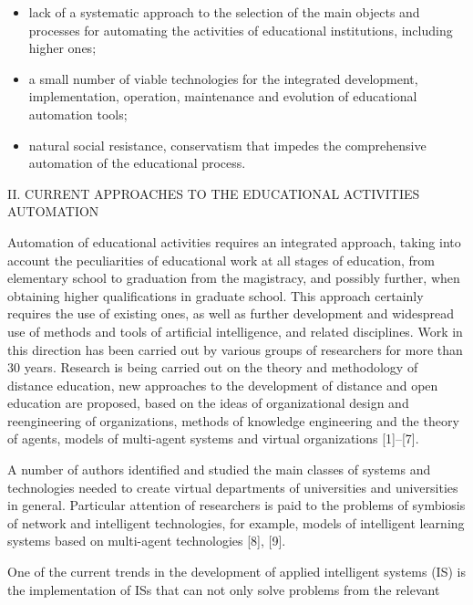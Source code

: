 \documentclass[twocolumn]{article}
\begin{document}
\begin{multicols}{2}
\begin{itemize}
\item lack of a systematic approach to the selection of the
main objects and processes for automating the activities of educational institutions, including higher
ones;
\item a small number of viable technologies for the
integrated development, implementation, operation,
maintenance and evolution of educational automation tools;
\item natural social resistance, conservatism that impedes
the comprehensive automation of the educational
process.
\end{itemize}
\begin{center} 
II. CURRENT APPROACHES TO THE EDUCATIONAL ACTIVITIES AUTOMATION
\end{center}
\par Automation of educational activities requires an integrated approach, taking into account the peculiarities
of educational work at all stages of education, from
elementary school to graduation from the magistracy,
and possibly further, when obtaining higher qualifications
in graduate school. This approach certainly requires the
use of existing ones, as well as further development and
widespread use of methods and tools of artificial intelligence, and related disciplines. Work in this direction
has been carried out by various groups of researchers
for more than 30 years. Research is being carried out on
the theory and methodology of distance education, new
approaches to the development of distance and open education are proposed, based on the ideas of organizational
design and reengineering of organizations, methods of
knowledge engineering and the theory of agents, models
of multi-agent systems and virtual organizations [1]--[7].
\par A number of authors identified and studied the main
classes of systems and technologies needed to create
virtual departments of universities and universities in
general. Particular attention of researchers is paid to
the problems of symbiosis of network and intelligent
technologies, for example, models of intelligent learning
systems based on multi-agent technologies [8], [9].
\par One of the current trends in the development of applied
intelligent systems (IS) is the implementation of ISs
that can not only solve problems from the relevant
\end{multicols}
\end{document}
